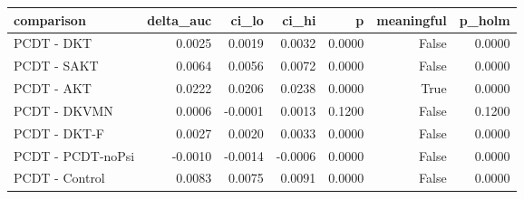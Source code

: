 \begin{tabular}{lrrrrrr}
\toprule
comparison & delta\_auc & ci\_lo & ci\_hi & p & meaningful & p\_holm \\
\midrule
PCDT - DKT & 0.0025 & 0.0019 & 0.0032 & 0.0000 & False & 0.0000 \\
PCDT - SAKT & 0.0064 & 0.0056 & 0.0072 & 0.0000 & False & 0.0000 \\
PCDT - AKT & 0.0222 & 0.0206 & 0.0238 & 0.0000 & True & 0.0000 \\
PCDT - DKVMN & 0.0006 & -0.0001 & 0.0013 & 0.1200 & False & 0.1200 \\
PCDT - DKT-F & 0.0027 & 0.0020 & 0.0033 & 0.0000 & False & 0.0000 \\
PCDT - PCDT-noPsi & -0.0010 & -0.0014 & -0.0006 & 0.0000 & False & 0.0000 \\
PCDT - Control & 0.0083 & 0.0075 & 0.0091 & 0.0000 & False & 0.0000 \\
\bottomrule
\end{tabular}
